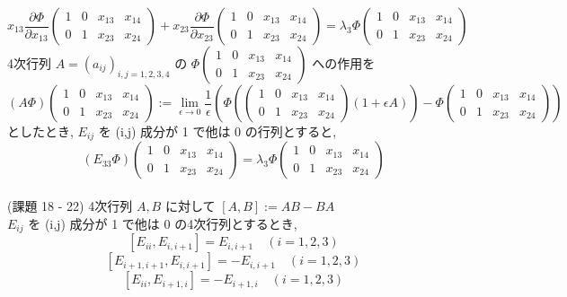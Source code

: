 \documentclass{article}
\begin{document}
\[ x_{13} \frac{\partial \Phi}{\partial x_{13}} \begin{pmatrix}
  1 & 0 & x_{13} & x_{14} \\
  0 & 1 & x_{23} & x_{24}
\end{pmatrix} + x_{23} \frac{\partial \Phi}{\partial x_{23}} \begin{pmatrix}
  1 & 0 & x_{13} & x_{14} \\
  0 & 1 & x_{23} & x_{24}
\end{pmatrix}= \lambda_3 \Phi \begin{pmatrix}
  1 & 0 & x_{13} & x_{14} \\
  0 & 1 & x_{23} & x_{24}
\end{pmatrix}\]
4次行列 $A = (a_{ij})_{i,j = 1,2,3,4}$ の $\Phi\begin{pmatrix}
  1 & 0 & x_{13} & x_{14} \\
  0 & 1 & x_{23} & x_{24}
\end{pmatrix}$ への作用を
\[ (A\Phi) \begin{pmatrix}
  1 & 0 & x_{13} & x_{14} \\
  0 & 1 & x_{23} & x_{24}
\end{pmatrix} := \lim_{\epsilon \to 0} \frac{1}{\epsilon} \left( \Phi \left( \begin{pmatrix}
  1 & 0 & x_{13} & x_{14} \\
  0 & 1 & x_{23} & x_{24} 
\end{pmatrix} (1 + \epsilon A) \right) - \Phi \begin{pmatrix}
  1 & 0 & x_{13} & x_{14} \\
  0 & 1 & x_{23} & x_{24} 
\end{pmatrix} \right) \]
としたとき,
$E_{ij}$ を (i,j) 成分が 1 で他は 0 の行列とすると,
\[ (E_{33} \Phi) \begin{pmatrix}
  1 & 0 & x_{13} & x_{14} \\
  0 & 1 & x_{23} & x_{24}
\end{pmatrix} = \lambda_3 \Phi \begin{pmatrix}
  1 & 0 & x_{13} & x_{14} \\
  0 & 1 & x_{23} & x_{24}
\end{pmatrix} \]
\\
(課題 18 - 22) 4次行列 $A,B$ に対して $[A,B] := AB - BA$\\
$E_{ij}$ を (i,j) 成分が 1 で他は 0 の4次行列とするとき, 
\[ [E_{ii}, E_{i,i+1}] = E_{i,i+1} \quad (i=1,2,3) \]
\[ [E_{i+1,i+1}, E_{i,i+1}] = -E_{i,i+1} \quad (i=1,2,3) \]
\[ [E_{ii}, E_{i+1,i}] = -E_{i+1,i} \quad (i=1,2,3) \]
\end{document}
